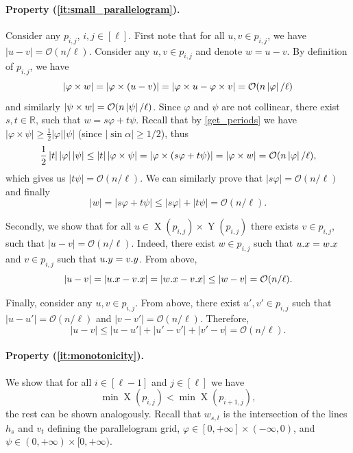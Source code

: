 \documentclass[twoside,leqno]{article}
\let\Cref\cref
\renewcommand{\O}{\mathcal{O}}
\renewcommand{\phi}{\varphi}
\DeclareMathOperator*{\X}{X}
\DeclareMathOperator*{\Y}{Y}
\newcommand{\absolute}[1]{\left\lvert#1\right\rvert}
\begin{document}
\paragraph*{Property (\ref{it:small_parallelogram}).}
Consider any $p_{i,j}$, $i,j \in [\ell]$. First note that	for all $u, v \in p_{i, j}$, we have $\absolute{u - v} = \O(n / \ell)$. Consider any $u, v \in p_{i, j}$ and denote $w = u - v$.
By definition of $p_{i, j}$, we have
\[ \absolute{\h{w}} = \absolute{\h{(u - v)}} = \absolute{\h{u} - \h{v}} = \O(n\absolute{\phi} / \ell) \]
and similarly $\absolute{\s{w}} = \O(n\absolute{\psi} / \ell)$. Since $\phi$ and $\psi$ are not collinear, there exist $s, t \in \mathbb{R}$, such that $w = s\phi + t\psi$. Recall that by \Cref{get_periods} we have $\absolute{\phi \times \psi} \ge \frac{1}{2}\absolute{\phi}\absolute{\psi}$ (since $\absolute{\sin \alpha} \ge 1/2$), thus
\[ \frac{1}{2}\absolute{t}\absolute{\phi}\absolute{\psi} \le \absolute{t}\absolute{\phi \times \psi} = \absolute{\phi \times (s\phi + t\psi)} = \absolute{\h{w}} = \O(n\absolute{\phi} / \ell), \]
which gives us $\absolute{t\psi} = \O(n / \ell)$. We can similarly prove that $\absolute{s\phi} = \O(n / \ell)$ and finally 
\[ \absolute{w} = \absolute{s\phi + t\psi} \le \absolute{s\phi} + \absolute{t\psi} = \O(n / \ell). \]

Secondly, we show that	for all $u \in \X(p_{i, j}) \times \Y(p_{i, j})$ there exists $v \in p_{i, j}$, such that $\absolute{u - v} = \O(n / \ell)$. Indeed, there exist $w \in p_{i, j}$ such that $u.x = w.x$ and $v \in p_{i, j}$ such that $u.y = v.y$. From above, 
\[\absolute{u - v} = \absolute{\x{u} - \x{v}} = \absolute{\x{w} - \x{v}} \le \absolute{w - v} = \O(n / \ell).\] 

Finally, consider any $u, v \in p_{i, j}$. From above, there exist $u', v' \in p_{i, j}$ such that $\absolute{u - u'} = \O(n / \ell)$ and $\absolute{v - v'} = \O(n / \ell)$. Therefore, 
\[ \absolute{u - v} \le \absolute{u - u'} + \absolute{u' - v'} + \absolute{v' - v} = \O(n / \ell). \]

\paragraph*{Property (\ref{it:monotonicity}).} 
We show that for all $i \in [\ell - 1]$ and $j \in [\ell]$ we have
$$\min \X(p_{i, j}) < \min \X(p_{i + 1, j}),$$
the rest can be shown analogously. Recall that $w_{s,t}$ is the intersection of the lines $h_s$ and $v_t$ defining the parallelogram grid, $\phi \in [0, +\infty] \times (-\infty,0)$, and $\psi \in (0,+\infty) \times [0,+\infty)$. 
\end{document}

